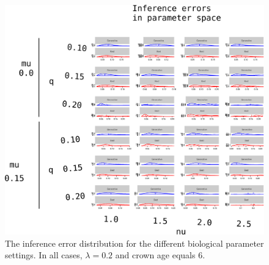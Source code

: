 \begin{figure}[!htbp]
  \includegraphics[width=\textwidth]{razzo-figures/20190621_figure_1_annotated.png}
  \caption{
    The inference error distribution 
    for the different biological
    parameter settings. In all cases, $\lambda = 0.2$ and 
    crown age equals 6. 
  }
  \label{fig:results}
\end{figure}